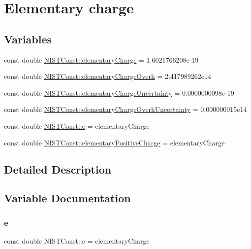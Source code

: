 \hypertarget{group___elementary_charge}{}\section{Elementary charge}
\label{group___elementary_charge}
\subsection*{Variables}
\begin{DoxyCompactItemize}
\item 
const double \hyperlink{group___elementary_charge_gaaa025a77a5281c83628ff8cb46f8038f}{N\+I\+S\+T\+Const\+::elementary\+Charge} = 1.\+6021766208e-\/19
\item 
const double \hyperlink{group___elementary_charge_ga262dea92054df909a97626e3c804f1b4}{N\+I\+S\+T\+Const\+::elementary\+Charge\+Overh} = 2.\+417989262e14
\item 
const double \hyperlink{group___elementary_charge_ga8e2ed13fe11bd4253e61c6f893a6778d}{N\+I\+S\+T\+Const\+::elementary\+Charge\+Uncertainty} = 0.\+0000000098e-\/19
\item 
const double \hyperlink{group___elementary_charge_gadc450d412ab46877fee4e29d8ccf7ce3}{N\+I\+S\+T\+Const\+::elementary\+Charge\+Overh\+Uncertainty} = 0.\+000000015e14
\item 
const double \hyperlink{group___elementary_charge_gad3e7e33fe20772dfbc4b39e433eb2f3a}{N\+I\+S\+T\+Const\+::e} = elementary\+Charge
\item 
const double \hyperlink{group___elementary_charge_ga1177663318bfe8bfa4b0c4fa489fbfb2}{N\+I\+S\+T\+Const\+::elementary\+Positive\+Charge} = elementary\+Charge
\end{DoxyCompactItemize}


\subsection{Detailed Description}


\subsection{Variable Documentation}
\mbox{\label{group___elementary_charge_gad3e7e33fe20772dfbc4b39e433eb2f3a}} 
\subsubsection{\texorpdfstring{e}{e}}
{\footnotesize\ttfamily const double N\+I\+S\+T\+Const\+::e = elementary\+Charge}

